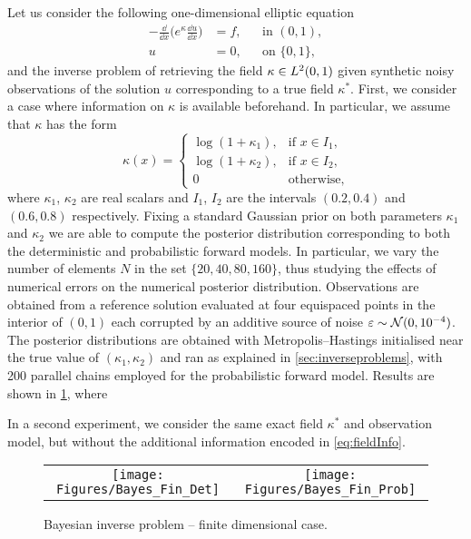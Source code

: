 \documentclass[10pt]{article}
\begin{document}
Let us consider the following one-dimensional elliptic equation
\begin{equation}
\begin{aligned}
	-\frac{\dd}{\dd x}\big(e^{\kappa} \frac{\dd u}{\dd x}\big) &= f, &&\text{in } (0,1),\\
	u &= 0, &&\text{on } \{0, 1\},
\end{aligned}
\end{equation}
and the inverse problem of retrieving the field $\kappa \in L^2(0, 1)$ given synthetic noisy observations of the solution $u$ corresponding to a true field $\kappa^*$. First, we consider a case where information on $\kappa$ is available beforehand. In particular, we assume that $\kappa$ has the form
\begin{equation}\label{eq:fieldInfo}
	\kappa(x) = \begin{cases}	
				\log(1 + \kappa_1), & \mbox{if } x \in I_1, \\
				\log(1 + \kappa_2), & \mbox{if } x \in I_2, \\	
				0 & \mbox{otherwise},
				\end{cases}
\end{equation}
where $\kappa_1$, $\kappa_2$ are real scalars and $I_1$, $I_2$ are the intervals $(0.2, 0.4)$ and $(0.6, 0.8)$ respectively. Fixing a standard Gaussian prior on both parameters $\kappa_1$ and $\kappa_2$ we are able to compute the posterior distribution corresponding to both the deterministic and probabilistic forward models. In particular, we vary the number of elements $N$ in the set $\{20, 40, 80, 160\}$, thus studying the effects of numerical errors on the numerical posterior distribution. Observations are obtained from a reference solution evaluated at four equispaced points in the interior of $(0, 1)$ each corrupted by an additive source of noise $\varepsilon \sim \mathcal N(0, 10^{-4})$. The posterior distributions are obtained with Metropolis--Hastings initialised near the true value of $(\kappa_1, \kappa_2)$ and ran as explained in \cref{sec:inverseproblems}, with 200 parallel chains employed for the probabilistic forward model. Results are shown in \cref{fig:BayesFin}, where \todo

In a second experiment, we consider the same exact field $\kappa^*$ and observation model, but without the additional information encoded in \eqref{eq:fieldInfo}.

\begin{figure}[t]
	\centering
	\begin{tabular}{cc}
		\texttt{[image: Figures/Bayes\_Fin\_Det]} & \texttt{[image: Figures/Bayes\_Fin\_Prob]} \\
	\end{tabular}
	\caption{Bayesian inverse problem -- finite dimensional case.}
	\label{fig:BayesFin}
\end{figure}
\end{document}
